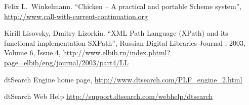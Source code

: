 \documentclass[a4paper,12pt]{article}
\begin{document}
\begin{thebibliography}{9}
Felix L.\ Winkelmann.
``Chicken -- A practical and portable Scheme system'',
\url{http://www.call-with-current-continuation.org}

Kirill Lisovsky, Dmitry Lizorkin.
``XML Path Language (XPath) and its functional implementation SXPath'',
Russian Digital Libraries Journal , 2003, Volume 6, Issue 4,
\url{http://www.elbib.ru/index.phtml?page=elbib/eng/journal/2003/part4/LL}

dtSearch Engine home page,
\url{http://www.dtsearch.com/PLF\_engine\_2.html}

dtSearch Web Help
\url{http://support.dtsearch.com/webhelp/dtsearch}

\end{thebibliography}
\end{document}
